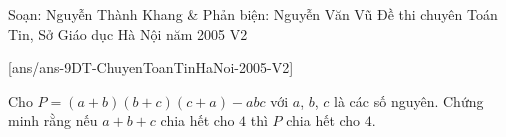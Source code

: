 \begin{name}
{Soạn: Nguyễn Thành Khang \& Phản biện: Nguyễn Văn Vũ}
{Đề thi chuyên Toán Tin, Sở Giáo dục Hà Nội năm 2005 V2}
\end{name}
\setcounter{ex}{0}
[ans/ans-9DT-ChuyenToanTinHaNoi-2005-V2]
\begin{ex}%
    Cho $P = \left(a + b\right)\left(b + c\right)\left(c + a\right) - abc$ với $a$, $b$, $c$ là các số nguyên. Chứng minh rằng nếu $a + b + c$ chia hết cho $4$ thì $P$ chia hết cho $4$.
\end{ex}
